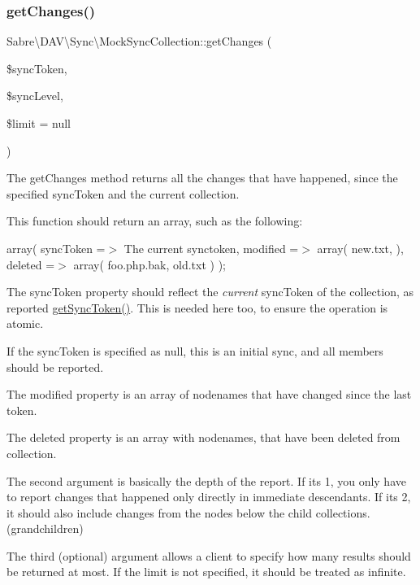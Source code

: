 \subsubsection{\texorpdfstring{get\+Changes()}{getChanges()}}
{\footnotesize\ttfamily Sabre\textbackslash{}\+D\+A\+V\textbackslash{}\+Sync\textbackslash{}\+Mock\+Sync\+Collection\+::get\+Changes (\begin{DoxyParamCaption}\item[{}]{\$sync\+Token,  }\item[{}]{\$sync\+Level,  }\item[{}]{\$limit = {\ttfamily null} }\end{DoxyParamCaption})}

The get\+Changes method returns all the changes that have happened, since the specified sync\+Token and the current collection.

This function should return an array, such as the following\+:

array( \textquotesingle{}sync\+Token\textquotesingle{} =$>$ \textquotesingle{}The current synctoken\textquotesingle{}, \textquotesingle{}modified\textquotesingle{} =$>$ array( \textquotesingle{}new.\+txt\textquotesingle{}, ), \textquotesingle{}deleted\textquotesingle{} =$>$ array( \textquotesingle{}foo.\+php.\+bak\textquotesingle{}, \textquotesingle{}old.\+txt\textquotesingle{} ) );

The sync\+Token property should reflect the {\itshape current} sync\+Token of the collection, as reported \mbox{\hyperlink{class_sabre_1_1_d_a_v_1_1_sync_1_1_mock_sync_collection_a9fc3b8d7c6e94be4c34c9b2761494f9c}{get\+Sync\+Token()}}. This is needed here too, to ensure the operation is atomic.

If the sync\+Token is specified as null, this is an initial sync, and all members should be reported.

The modified property is an array of nodenames that have changed since the last token.

The deleted property is an array with nodenames, that have been deleted from collection.

The second argument is basically the \textquotesingle{}depth\textquotesingle{} of the report. If it\textquotesingle{}s 1, you only have to report changes that happened only directly in immediate descendants. If it\textquotesingle{}s 2, it should also include changes from the nodes below the child collections. (grandchildren)

The third (optional) argument allows a client to specify how many results should be returned at most. If the limit is not specified, it should be treated as infinite.

